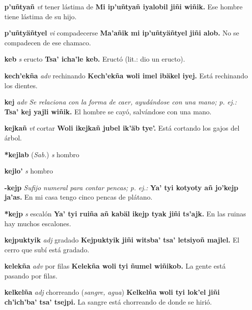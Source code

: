 \documentclass[10pt]{scrbook}
\newcommand{\entry}[1]{\textbf{#1}}
\newcommand{\alphaletter}[1]{\end{multicols}\addsec{#1}\begin{multicols}{2}}
\newcommand{\nontranslationdef}[1]{\textit{#1}}
\newcommand{\partofspeech}[1]{\textit{#1}}
\newcommand{\spanishtranslation}[1]{#1}
\newcommand{\clarification}[1]{(\textit{#1})}
\newcommand{\cholexample}[1]{\textbf{#1}}
\newcommand{\exampletranslation}[1]{#1}
\newcommand{\relevantdialect}[1]{(\textit{#1})}
\begin{document}
\begin{multicols}{2}
\entry{p'uñtyañ}
\partofspeech{vt}
\spanishtranslation{tener lástima de}
\cholexample{Mi ip'uñtyañ iyalobil jiñi wiñik.}
\exampletranslation{Ese hombre tiene lástima de su hijo.}

\entry{p'uñtyäñtyel}
\partofspeech{vi}
\spanishtranslation{compadecerse}
\cholexample{Ma'añik mi ip'uñtyäñtyel jiñi alob.}
\exampletranslation{No se compadecen de ese chamaco.}

\alphaletter{Q}

\entry{keb}
\partofspeech{s}
\spanishtranslation{eructo}
\cholexample{Tsa' icha'le keb.}
\exampletranslation{Eructó (lit.: dio un eructo).}

\entry{kech'ekña}
\partofspeech{adv}
\spanishtranslation{rechinando}
\cholexample{Kech'ekña woli imel ibäkel iyej.}
\exampletranslation{Está rechinando los dientes.}

\entry{kej}
\partofspeech{adv}
\nontranslationdef{Se relaciona con la forma de caer, ayudándose con una mano; p. ej.:}
\cholexample{Tsa' kej yajli wiñik.}
\exampletranslation{El hombre se cayó, salvándose con una mano.}

\entry{kejkañ}
\partofspeech{vt}
\spanishtranslation{cortar}
\cholexample{Woli ikejkañ jubel ik'äb tye'.}
\exampletranslation{Está cortando los gajos del árbol.}

\entry{*kejlab}
\relevantdialect{Sab.}
\partofspeech{s}
\spanishtranslation{hombro}

\entry{kejlo'}
\partofspeech{s}
\spanishtranslation{hombro}

\entry{-kejp}
\nontranslationdef{Sufijo numeral para contar pencas; p. ej.:}
\cholexample{Ya' tyi kotyoty añ jo'kejp ja'as.}
\exampletranslation{En mi casa tengo cinco pencas de plátano.}

\entry{*kejp}
\partofspeech{s}
\spanishtranslation{escalón}
\cholexample{Ya' tyi ruiña añ kabäl ikejp tyak jiñi ts'ajk.}
\exampletranslation{En las ruinas hay muchos escalones.}

\entry{kejpuktyik}
\partofspeech{adj}
\spanishtranslation{gradado}
\cholexample{Kejpuktyik jiñi witsba' tsa' letsiyoñ majlel.}
\exampletranslation{El cerro que subí está gradado.}

\entry{kelekña}
\partofspeech{adv}
\spanishtranslation{por filas}
\cholexample{Kelekña woli tyi ñumel wiñikob.}
\exampletranslation{La gente está pasando por filas.}

\entry{kelkelña}
\partofspeech{adj}
\spanishtranslation{chorreando}
\clarification{sangre, agua}
\cholexample{Kelkelña woli tyi lok'el jiñi ch'ich'ba' tsa' tsejpi.}
\exampletranslation{La sangre está chorreando de donde se hirió.}


\end{multicols}
\end{document}
